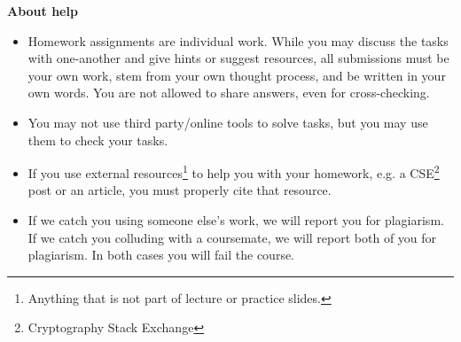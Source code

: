 \documentclass{homework}
\begin{document}
\textbf{About help}
\begin{itemize}
  \item Homework assignments are individual work.
  While you may discuss the tasks with one-another and give hints or suggest resources, all submissions must be your own work, stem from your own thought process, and be written in your own words.
  You are not allowed to share answers, even for cross-checking.
  \item You may not use third party/online tools to solve tasks, but you may use them to check your tasks.
  \item If you use external resources\footnote{Anything that is not part of lecture or practice slides.} to help you with your homework, e.g. a CSE\footnote{Cryptography Stack Exchange} post or an article, you must properly cite that resource.
  \item If we catch you using someone else's work, we will report you for plagiarism.
  If we catch you colluding with a coursemate, we will report both of you for plagiarism.
  In both cases you will fail the course.
\end{itemize}

\newpage
\end{document}

